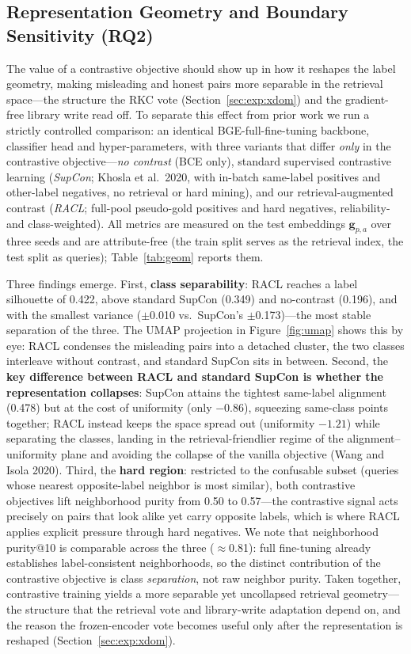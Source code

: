 \documentclass[11pt]{article}
\begin{document}
\subsection{Representation Geometry and Boundary Sensitivity (RQ2)}
\label{sec:exp:geom}

The value of a contrastive objective should show up in how it reshapes the label
geometry, making misleading and honest pairs more separable in the retrieval
space---the structure the RKC vote (Section~\ref{sec:exp:xdom}) and the
gradient-free library write read off. To separate this effect from prior work we
run a strictly controlled comparison: an identical BGE-full-fine-tuning backbone,
classifier head and hyper-parameters, with three variants that differ \emph{only}
in the contrastive objective---\emph{no contrast} (BCE only), standard supervised
contrastive learning (\emph{SupCon}; Khosla et al.\ 2020, with in-batch
same-label positives and other-label negatives, no retrieval or hard mining), and
our retrieval-augmented contrast (\emph{RACL}; full-pool pseudo-gold positives and
hard negatives, reliability- and class-weighted). All metrics are measured on the
test embeddings $\mathbf{g}_{p,a}$ over three seeds and are attribute-free (the
train split serves as the retrieval index, the test split as queries);
Table~\ref{tab:geom} reports them.

Three findings emerge. First, \textbf{class separability}: RACL reaches a label
silhouette of 0.422, above standard SupCon (0.349) and no-contrast (0.196), and
with the smallest variance ($\pm$0.010 vs.\ SupCon's $\pm$0.173)---the most stable
separation of the three. The UMAP projection in Figure~\ref{fig:umap} shows this
by eye: RACL condenses the misleading pairs into a detached cluster, the two
classes interleave without contrast, and standard SupCon sits in between. Second,
the \textbf{key difference between RACL and standard SupCon is whether the
representation collapses}: SupCon attains the tightest same-label alignment
(0.478) but at the cost of uniformity (only $-0.86$), squeezing same-class points
together; RACL instead keeps the space spread out (uniformity $-1.21$) while
separating the classes, landing in the retrieval-friendlier regime of the
alignment--uniformity plane and avoiding the collapse of the vanilla objective
(Wang and Isola 2020). Third, the \textbf{hard region}: restricted to the
confusable subset (queries whose nearest opposite-label neighbor is most similar),
both contrastive objectives lift neighborhood purity from 0.50 to 0.57---the
contrastive signal acts precisely on pairs that look alike yet carry opposite
labels, which is where RACL applies explicit pressure through hard negatives. We
note that neighborhood purity@10 is comparable across the three ($\approx$0.81):
full fine-tuning already establishes label-consistent neighborhoods, so the
distinct contribution of the contrastive objective is class \emph{separation},
not raw neighbor purity. Taken together, contrastive training yields a more
separable yet uncollapsed retrieval geometry---the structure that the retrieval
vote and library-write adaptation depend on, and the reason the frozen-encoder
vote becomes useful only after the representation is reshaped
(Section~\ref{sec:exp:xdom}).
\end{document}
